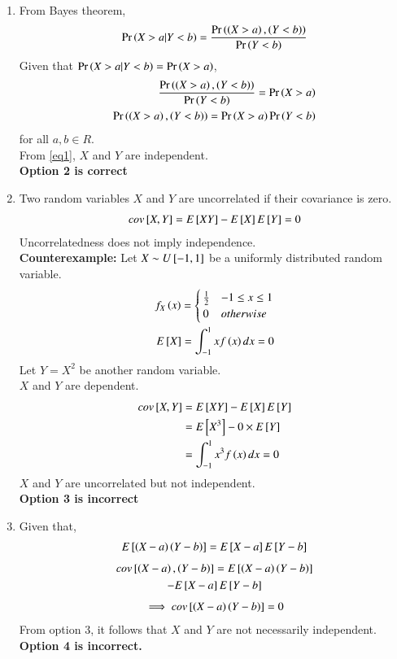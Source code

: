 \documentclass[journal,12pt,twocolumn]{IEEEtran}
\begin{document}
\begin{enumerate}
    \item From Bayes theorem,
    \begin{align}
      \Pr\left(X>a|Y<b\right)=\frac{\Pr\left(\left(X>a\right),\left(Y<b\right)\right)}{\Pr\left(Y<b\right)}
    \end{align}
    Given that $\Pr\left(X>a|Y<b\right)=\Pr\left(X>a\right)$,
    \begin{align}
        \frac{\Pr\left(\left(X>a\right),\left(Y<b\right)\right)}{\Pr\left(Y<b\right)}=\Pr\left(X>a\right)\\
        \Pr\left(\left(X>a\right),\left(Y<b\right)\right)=\Pr\left(X>a\right)\Pr\left(Y<b\right)
    \end{align}
    for all $a,b\in R$.\\
    From \eqref{eq1}, $X$ and $Y$ are independent. \\
    \textbf{Option 2 is correct}
    \item Two random variables $X$ and $Y$ are uncorrelated if their covariance is zero.
    \begin{align}
        cov{}\left[X,Y\right]=E{}\left[XY\right]-E{}\left[X\right]E{}\left[Y\right]=0
    \end{align}
    Uncorrelatedness does not imply independence.\\
    \textbf{Counterexample:} Let $X\sim U {}\left[-1,1\right]$ be a uniformly distributed random variable.
    \begin{align}
        f_X\left(x\right)=
        \begin{cases}
        \frac{1}{2} & -1\leq x \leq 1\\
        0 & otherwise
        \end{cases}\\
        E{}\left[X\right]=\int_{-1}^{1}x f\left(x\right) dx=0
    \end{align}
    Let $Y=X^2$ be another random variable.\\
    $X$ and $Y$ are dependent.
    \begin{align}
        cov{}\left[X,Y\right]&=E{}\left[XY\right]-E{}\left[X\right]E{}\left[Y\right]\\
        &=E{}\left[X^3\right]-0\times E{}\left[Y\right]\\
        &=\int_{-1}^{1}x^3 f\left(x\right) dx=0
    \end{align}
    $X$ and $Y$ are uncorrelated but not independent.\\
    \textbf{Option 3 is incorrect}
    \item Given that,
    \begin{align}
        E{}\left[\left(X-a\right)\left(Y-b\right)\right]=E{}\left[X-a\right]E{}\left[Y-b\right]
    \end{align}
    \begin{multline}
        cov{}\left[\left(X-a\right),\left(Y-b\right)\right]=
        E{}\left[\left(X-a\right)\left(Y-b\right)\right]\\-E{}\left[X-a\right]E{}\left[Y-b\right]
    \end{multline}
    \begin{align}
        \implies cov{}\left[\left(X-a\right)\left(Y-b\right)\right]=0
    \end{align}
    From option 3, it follows that $X$ and $Y$ are not necessarily independent.\\
    \textbf{Option 4 is incorrect.}
\end{enumerate}
\end{document}
